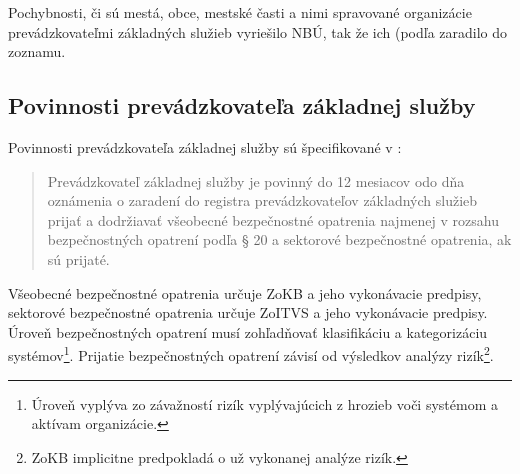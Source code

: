 Pochybnosti, či sú mestá, obce, mestské časti a nimi spravované organizácie prevádzkovateľmi základných služieb vyriešilo
NBÚ, tak že ich (podľa \cite[\S 5, ods. (1) písm. k)]{69/2018} zaradilo do zoznamu.

\subsection{Povinnosti prevádzkovateľa základnej služby}

Povinnosti prevádzkovateľa základnej služby sú špecifikované v \cite[\S 19, ods. (1)]{69/2018}:
\begin{quote}
  Prevádzkovateľ základnej služby je povinný do 12 mesiacov odo dňa oznámenia o zaradení do registra prevádzkovateľov
  základných služieb prijať a dodržiavať všeobecné bezpečnostné opatrenia najmenej v rozsahu bezpečnostných opatrení
  podľa § 20 a sektorové bezpečnostné opatrenia, ak sú prijaté.
\end{quote}
Všeobecné bezpečnostné opatrenia určuje ZoKB a jeho vykonávacie predpisy, sektorové bezpečnostné opatrenia určuje ZoITVS
a jeho vykonávacie predpisy. Úroveň bezpečnostných opatrení musí zohľadňovať klasifikáciu a kategorizáciu systémov\footnote{Úroveň
vyplýva zo závažností rizík vyplývajúcich z hrozieb voči systémom a aktívam organizácie.}. Prijatie bezpečnostných opatrení
závisí od výsledkov analýzy rizík\footnote{\acrshort{ZoKB} implicitne predpokladá o už vykonanej analýze rizík.}.

